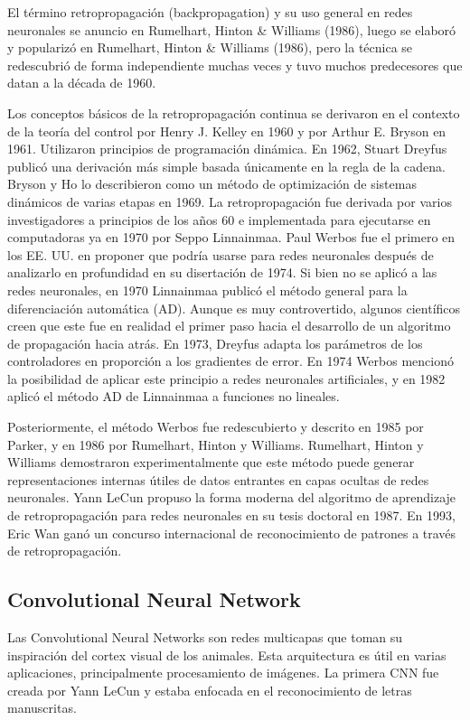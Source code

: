 \documentclass[a4paper]{article}
\begin{document}
El término retropropagación (backpropagation) y su uso general en redes neuronales
se anuncio en Rumelhart, Hinton \& Williams (1986), luego se elaboró y popularizó en Rumelhart, 
Hinton \& Williams (1986), pero la técnica se redescubrió de forma independiente muchas veces 
y tuvo muchos predecesores que datan a la década de 1960.

Los conceptos básicos de la retropropagación continua se derivaron en el contexto de la teoría 
del control por Henry J. Kelley en 1960 y por Arthur E. Bryson en 1961. Utilizaron principios 
de programación dinámica. En 1962, Stuart Dreyfus publicó una derivación más simple basada 
únicamente en la regla de la cadena. Bryson y Ho lo describieron como un método de optimización 
de sistemas dinámicos de varias etapas en 1969. La retropropagación fue derivada por varios 
investigadores a principios de los años 60 e implementada para ejecutarse en computadoras ya en
1970 por Seppo Linnainmaa. Paul Werbos fue el primero en los EE. UU. en proponer que podría 
usarse para redes neuronales después de analizarlo en profundidad en su disertación de 1974. 
Si bien no se aplicó a las redes neuronales, en 1970 Linnainmaa publicó el método general para 
la diferenciación automática (AD). Aunque es muy controvertido, algunos científicos creen que 
este fue en realidad el primer paso hacia el desarrollo de un algoritmo de propagación hacia 
atrás. En 1973, Dreyfus adapta los parámetros de los controladores en proporción a los gradientes 
de error. En 1974 Werbos mencionó la posibilidad de aplicar este principio a redes neuronales 
artificiales, y en 1982 aplicó el método AD de Linnainmaa a funciones no lineales.

Posteriormente, el método Werbos fue redescubierto y descrito en 1985 por Parker, y en 1986 
por Rumelhart, Hinton y Williams. Rumelhart, Hinton y Williams demostraron experimentalmente 
que este método puede generar representaciones internas útiles de datos entrantes en capas 
ocultas de redes neuronales. Yann LeCun propuso la forma moderna del algoritmo de aprendizaje 
de retropropagación para redes neuronales en su tesis doctoral en 1987. En 1993, Eric Wan ganó 
un concurso internacional de reconocimiento de patrones a través de retropropagación.

\subsection{Convolutional Neural Network}
Las Convolutional Neural Networks son redes multicapas que toman su inspiración del cortex 
visual de los animales. Esta arquitectura es útil en varias aplicaciones, principalmente 
procesamiento de imágenes. La primera CNN fue creada por Yann LeCun y estaba enfocada en el 
reconocimiento de letras manuscritas.
\end{document}
